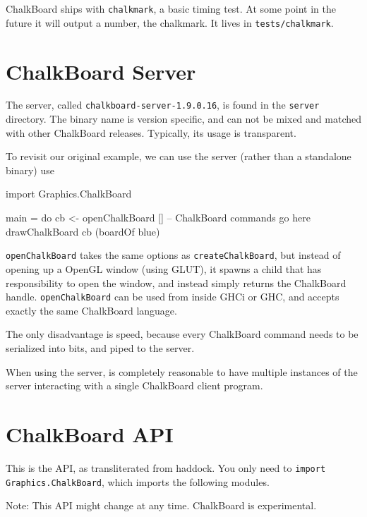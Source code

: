 \documentclass{article}
\newcommand{\cbserver}{\texttt{chalkboard-server-1.9.0.16}}
\begin{document}
ChalkBoard ships with \verb|chalkmark|, a basic timing test. At some point
in the future it will output a number, the chalkmark. It lives in 
\verb|tests/chalkmark|.

\newpage
\section{ChalkBoard Server}\label{sec:server}

The server, called \cbserver, is found in the \verb|server| directory.
The binary name is version specific, and can not be mixed and matched
with other ChalkBoard releases. Typically, its usage is transparent.

To revisit our original example, we can use the server (rather than a standalone
binary) use  

\begin{DSL}[label={ServerExample.hs}]
import Graphics.ChalkBoard

main = do cb <- openChalkBoard []
          -- ChalkBoard commands go here
          drawChalkBoard cb (boardOf blue)
\end{DSL}

\texttt{openChalkBoard} takes the same options as \texttt{createChalkBoard},
but instead of opening up a OpenGL window (using GLUT), it spawns
a child that has responsibility to open the window, and instead simply
returns the ChalkBoard handle. \texttt{openChalkBoard}  can be used 
from inside GHCi or GHC, and accepts exactly the same ChalkBoard language.

The only disadvantage is speed, because every ChalkBoard command needs
to be serialized into bits, and piped to the server.

When using the server, is completely reasonable to have multiple instances
of the server interacting with a single ChalkBoard client program.

\newpage
\section{ChalkBoard API}

This is the API, as transliterated from haddock.
You only need to {\tt import Graphics.ChalkBoard},  which imports
the following modules.

Note: This API might change at any time. ChalkBoard is experimental.








\end{document}
